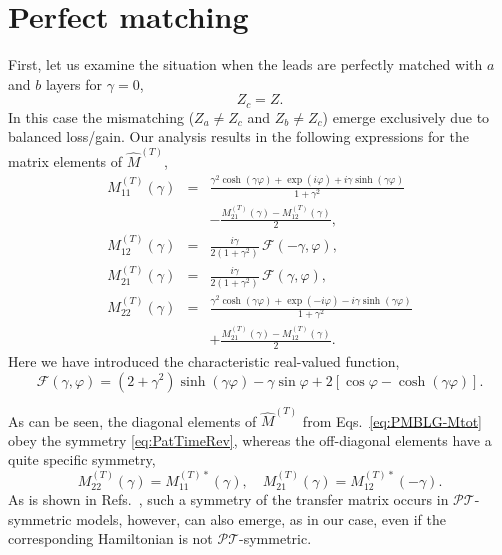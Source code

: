 \documentclass[aps,pra,reprint,showpacs,bibnotes,preprintnumbers,twoside,eqsecnum]{revtex4-1}
\begin{document}
\section{Perfect matching}

First, let us examine the situation when the leads are perfectly matched with $a$ and $b$ layers for $\gamma=0$,
%
\begin{equation}\label{eq:PMBLG-def}
Z_c=Z.
\end{equation}
In this case the mismatching ($Z_a\neq Z_c$ and $Z_b\neq Z_c$) emerge exclusively due to balanced loss/gain. Our analysis results in the following expressions for the matrix elements of $\hat{M}^{(T)}$,
%
\begin{eqnarray}\label{eq:PMBLG-Mtot}
M^{(T)}_{11}(\gamma)&=&\frac{\gamma^2\cosh(\gamma\varphi)+\exp(i\varphi)+i\gamma\sinh(\gamma\varphi)}{1+\gamma^2}\nonumber\\
&&-\frac{M^{(T)}_{21}(\gamma)-M^{(T)}_{12}(\gamma)}{2},\nonumber\\
M^{(T)}_{12}(\gamma)&=&\frac{i\gamma}{2(1+\gamma^2)}\,\mathcal{F}(-\gamma,\varphi),\\
M^{(T)}_{21}(\gamma)&=&\frac{i\gamma}{2(1+\gamma^2)}\,\mathcal{F}(\gamma,\varphi),\nonumber\\
M^{(T)}_{22}(\gamma)&=&\frac{\gamma^2\cosh(\gamma\varphi)+\exp(-i\varphi)-i\gamma\sinh(\gamma\varphi)}{1+\gamma^2}\nonumber\\[6pt]
&&+\frac{M^{(T)}_{21}(\gamma)-M^{(T)}_{12}(\gamma)}{2}.\nonumber
\end{eqnarray}
Here we have introduced the characteristic real-valued function,
%
\begin{equation}\label{eq:F-def}
\mathcal{F}(\gamma,\varphi)=(2+\gamma^2)\sinh(\gamma\varphi)-\gamma\sin\varphi+2[\cos\varphi-\cosh(\gamma\varphi)].
\end{equation}

As can be seen, the diagonal elements of $\hat{M}^{(T)}$ from Eqs.~\eqref{eq:PMBLG-Mtot} obey the symmetry \eqref{eq:PatTimeRev}, whereas the off-diagonal elements have a quite specific symmetry,
%
\begin{equation}\label{eq:BLG-Msym}
M^{(T)}_{22}(\gamma)=M^{(T)*}_{11}(\gamma),\quad M^{(T)}_{21}(\gamma)=M^{(T)*}_{12}(-\gamma).
\end{equation}
As is shown in Refs.~\cite{L10,M13,RIMC16,VHIC14,VIC15}, such a symmetry of the transfer matrix occurs in $\mathcal{P}\mathcal{T}$-symmetric models, however, can also emerge, as in our case, even if the corresponding Hamiltonian is not $\mathcal{P}\mathcal{T}$-symmetric.
\end{document}
